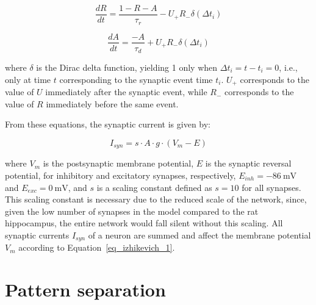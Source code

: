 \begin{equation}
    \label{eq_tsodyks_dR}
    \frac{dR}{dt} = \frac{1-R-A}{\tau_r} - U_{+} R_{-} \delta(\Delta t_i)
\end{equation}

\begin{equation}
    \label{eq_tsodyks_dA}
    \frac{dA}{dt} = \frac{-A}{\tau_d} + U_{+} R_{-} \delta(\Delta t_i)
\end{equation}

where $\delta$ is the Dirac delta function, yielding 1 only when $\Delta t_i = t - t_i = 0$, i.e., only at time $t$
corresponding to the synaptic event time $t_i$. $U_{+}$ corresponds to the value of $U$ immediately after the synaptic event,
while $R_{-}$ corresponds to the value of $R$ immediately before the same event.

From these equations, the synaptic current is given by:

\begin{equation}
    \label{eq_tsodyks_I}
    I_{syn} = s \cdot A \cdot g \cdot (V_m - E)
\end{equation}

where $V_m$ is the postsynaptic membrane potential, $E$ is the synaptic reversal potential, for inhibitory and excitatory
synapses, respectively, $E_{inh} = \SI{-86}{\milli\volt}$ and $E_{exc} = \SI{0}{\milli\volt}$, and $s$ is a scaling constant
defined as $s = 10$ for all synapses. This scaling constant is necessary due to the reduced scale of the network, since, given
the low number of synapses in the model compared to the rat hippocampus, the entire network would fall silent without this
scaling. All synaptic currents $I_{syn}$ of a neuron are summed and affect the membrane potential $V_m$ according to
Equation~\ref{eq_izhikevich_1}.



\section{Pattern separation}\label{sec:separacao_padroes}

